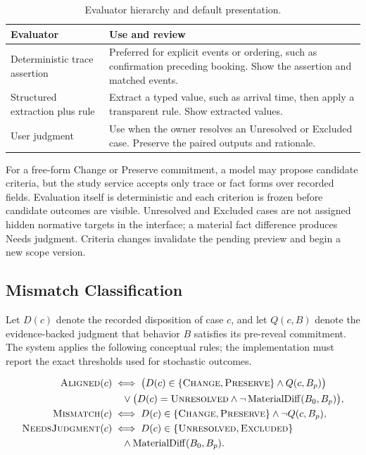 \begin{table}[t]
    \caption{Evaluator hierarchy and default presentation.}
    \label{tab:evaluator-types}
    \small
    \begin{tabularx}{\columnwidth}{@{}p{}Y@{}}
        \toprule
        \textbf{Evaluator} & \textbf{Use and review} \\
        \midrule
        Deterministic trace assertion & Preferred for explicit events or ordering, such as confirmation preceding booking. Show the assertion and matched events. \\
        Structured extraction plus rule & Extract a typed value, such as arrival time, then apply a transparent rule. Show extracted values. \\
        User judgment & Use when the owner resolves an Unresolved or Excluded case. Preserve the paired outputs and rationale. \\
        \bottomrule
    \end{tabularx}
\end{table}

For a free-form Change or Preserve commitment, a model may propose candidate criteria, but the study service accepts only trace or fact forms over recorded fields. Evaluation itself is deterministic and each criterion is frozen before candidate outcomes are visible. Unresolved and Excluded cases are not assigned hidden normative targets in the interface; a material fact difference produces Needs judgment. Criteria changes invalidate the pending preview and begin a new scope version.

\subsection{Mismatch Classification}
\label{app:mismatch-rules}

Let $D(c)$ denote the recorded disposition of case $c$, and let $Q(c,B)$ denote the evidence-backed judgment that behavior $B$ satisfies its pre-reveal commitment. The system applies the following conceptual rules; the implementation must report the exact thresholds used for stochastic outcomes.

\begin{align*}
\textsc{Aligned}(c) &\iff \big(D(c)\in\{\textsc{Change},\textsc{Preserve}\} \land Q(c,B_p)\big)\\
&\quad \lor \big(D(c)=\textsc{Unresolved} \land \neg\operatorname{MaterialDiff}(B_0,B_p)\big),\\
\textsc{Mismatch}(c) &\iff D(c)\in\{\textsc{Change},\textsc{Preserve}\} \land \neg Q(c,B_p),\\
\textsc{NeedsJudgment}(c) &\iff D(c)\in\{\textsc{Unresolved},\textsc{Excluded}\} \\
&\quad \land \operatorname{MaterialDiff}(B_0,B_p).
\end{align*}

